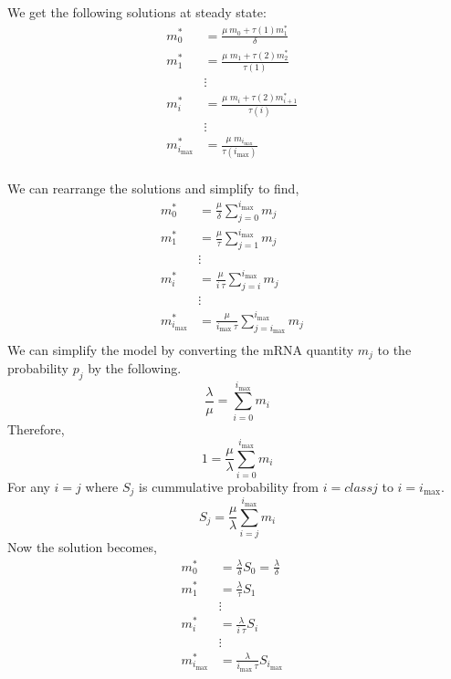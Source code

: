 \documentclass[review]{elsarticle}
\newcommand{\imax}{\ensuremath{{i_{\max}}}\xspace}
\begin{document}
We get the following solutions at steady state:
\begin{align*}
m_{0}^{*}  &= \frac{\mu\: m_{0}+\tau(1)m_{1}^{*}}{\delta} \\
m_{1}^{*}  &= \frac{\mu \; m_{1}+\tau(2)m_{2}^{*}}{\tau(1)} \\
& \vdots & \\
m_{i}^{*}  &= \frac{\mu \; m_{i}+\tau(2)m_{i+1}^{*}}{\tau(i)} \\
& \vdots & \\
m_{\imax}^{*}  &= \frac{\mu \; m_{\imax}}{\tau(\imax)} \\
\end{align*}

We can rearrange the solutions and simplify to find,
\begin{align*}
m_{0}^{*}  &= \frac{\mu}{\delta}\sum_{j=0}^{\imax}m_{j} \\
m_{1}^{*}  &= \frac{\mu}{\tau}\sum_{j=1}^{\imax}m_{j}  \\
& \vdots & \\
m_{i}^{*}  &= \frac{\mu}{i \: \tau}\sum_{j=i}^{\imax}m_{j}  \\
& \vdots & \\
m_{\imax}^{*}  &= \frac{\mu}{\imax \: \tau}\sum_{j=\imax}^{\imax}m_{j}  \\
\end{align*}
We can simplify the model by converting the mRNA quantity $m_{j}$ to the probability $p_{j}$ by the following.
\begin{equation}
	\frac{\lambda}{\mu}=\sum_{i=0}^{\imax}m_{i}
\end{equation}
Therefore,
\begin{equation}
		1= \frac{\mu}{\lambda}\sum_{i=0}^{\imax}m_{i}
\end{equation}
For any $i=j$ where $S_{j}$ is cummulative probability from $i=class j$ to $ i= \imax$.
\begin{equation}
		S_{j} = \frac{\mu}{\lambda}\sum_{i=j}^{\imax}m_{i}
\end{equation}
Now the solution becomes,
\begin{align}
m_{0}^{*}  &= \frac{\lambda}{\delta}S_{0}=\frac{\lambda}{\delta} \\ \nonumber
m_{1}^{*}  &= \frac{\lambda}{\tau}S_{1} \\ \nonumber
& \vdots & \\ \nonumber
m_{i}^{*}  &= \frac{\lambda}{i \: \tau}S_{i}  \\ \nonumber
& \vdots & \\ \nonumber
m_{\imax}^{*}  &= \frac{\lambda}{\imax \: \tau}S_{\imax}  \\ \nonumber
\end{align}
\end{document}
